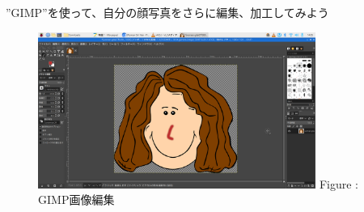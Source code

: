\documentclass[a4paper,12pt]{jarticle}
\begin{document}
\theQuestion

”GIMP”を使って、自分の顔写真をさらに編集、加工してみよう

\begin{figure}[ht]
  \centering
  \begin{minipage}{9.082cm}
    {\upshape
      \includegraphics[width=9.082cm]{textbook-img131.png}
      \newline
      Figure : GIMP画像編集}
  \end{minipage}
\end{figure}

~
\vfill
\clearpage
\end{document}
